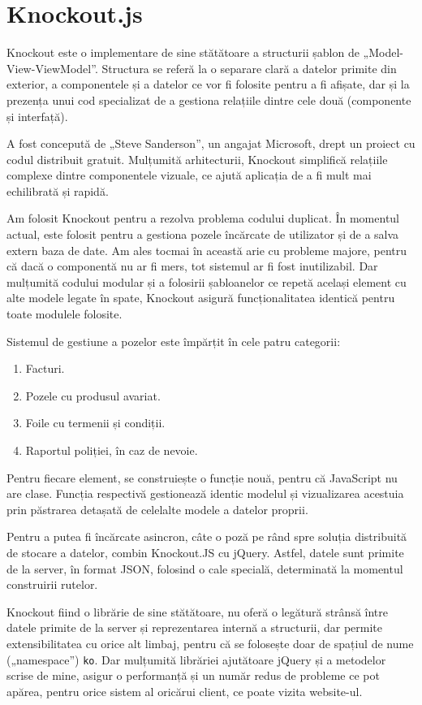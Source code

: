\section{Knockout.js}

	Knockout este o implementare de sine stătătoare a structurii șablon de „Model-View-ViewModel”.
	Structura se referă la o separare clară a datelor primite din exterior, a componentele și a datelor ce vor fi folosite pentru a fi afișate, dar și la prezența unui cod specializat de a gestiona relațiile dintre cele două (componente și interfață). \cite{knockout_js}

	A fost concepută de „Steve Sanderson”, un angajat Microsoft, drept un proiect cu codul distribuit gratuit. \cite{knockout_js_site}
	Mulțumită arhitecturii, Knockout simplifică relațiile complexe dintre componentele vizuale, ce ajută aplicația de a fi mult mai echilibrată și rapidă.

	Am folosit Knockout pentru a rezolva problema codului duplicat.
	În momentul actual, este folosit pentru a gestiona pozele încărcate de utilizator și de a salva extern baza de date.
	Am ales tocmai în această arie cu probleme majore, pentru că dacă o componentă nu ar fi mers, tot sistemul ar fi fost inutilizabil.
	Dar mulțumită codului modular și a folosirii șabloanelor ce repetă același element cu alte modele legate în spate, Knockout asigură funcționalitatea identică pentru toate modulele folosite.

	Sistemul de gestiune a pozelor este împărțit în cele patru categorii:
	\begin{enumerate}
		\item Facturi.
		\item Pozele cu produsul avariat.
		\item Foile cu termenii și condiții.
		\item Raportul poliției, în caz de nevoie.
	\end{enumerate}
	Pentru fiecare element, se construiește o funcție nouă, pentru că JavaScript nu are clase.
	Funcția respectivă gestionează identic modelul și vizualizarea acestuia prin păstrarea detașată de celelalte modele a datelor proprii.

	Pentru a putea fi încărcate asincron, câte o poză pe rând spre soluția distribuită de stocare a datelor, combin Knockout.JS cu jQuery.
	Astfel, datele sunt primite de la server, în format JSON, folosind o cale specială, determinată la momentul construirii rutelor.

	Knockout fiind o librărie de sine stătătoare, nu oferă o legătură strânsă între datele primite de la server și reprezentarea internă a structurii, dar permite extensibilitatea cu orice alt limbaj, pentru că se folosește doar de spațiul de nume („namespace”) \verb|ko|.
	Dar mulțumită librăriei ajutătoare jQuery și a metodelor scrise de mine, asigur o performanță și un număr redus de probleme ce pot apărea, pentru orice sistem al oricărui client, ce poate vizita website-ul.

